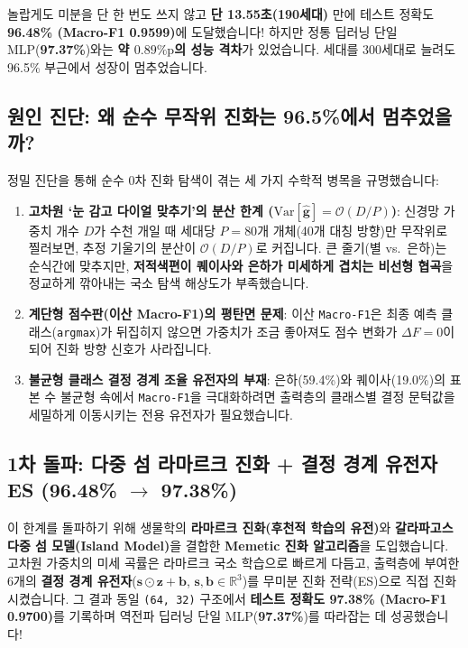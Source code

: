 \documentclass[11pt,a4paper]{article}
\begin{document}
놀랍게도 미분을 단 한 번도 쓰지 않고 \textbf{단 13.55초(190세대)} 만에 테스트 정확도 \textbf{96.48\% (Macro-F1 0.9599)}에 도달했습니다! 하지만 정통 딥러닝 단일 MLP(\textbf{97.37\%})와는 \textbf{약 $0.89\%\text{p}$의 성능 격차}가 있었습니다. 세대를 300세대로 늘려도 96.5\% 부근에서 성장이 멈추었습니다.

\subsection{원인 진단: 왜 순수 무작위 진화는 96.5\%에서 멈추었을까?}

정밀 진단을 통해 순수 0차 진화 탐색이 겪는 세 가지 수학적 병목을 규명했습니다:
\begin{enumerate}[leftmargin=18pt, itemsep=3pt]
  \item \textbf{고차원 `눈 감고 다이얼 맞추기'의 분산 한계 ($\mathrm{Var}[\hat{\mathbf{g}}] = \mathcal{O}(D/P)$)}:
    신경망 가중치 개수 $D$가 수천 개일 때 세대당 $P=80$개 개체(40개 대칭 방향)만 무작위로 찔러보면, 추정 기울기의 분산이 $\mathcal{O}(D/P)$로 커집니다. 큰 줄기(별 vs.\ 은하)는 순식간에 맞추지만, \textbf{저적색편이 퀘이사와 은하가 미세하게 겹치는 비선형 협곡}을 정교하게 깎아내는 국소 탐색 해상도가 부족했습니다.
  \item \textbf{계단형 점수판(이산 Macro-F1)의 평탄면 문제}:
    이산 \texttt{Macro-F1}은 최종 예측 클래스(\texttt{argmax})가 뒤집히지 않으면 가중치가 조금 좋아져도 점수 변화가 $\Delta F = 0$이 되어 진화 방향 신호가 사라집니다.
  \item \textbf{불균형 클래스 결정 경계 조율 유전자의 부재}:
    은하(59.4\%)와 퀘이사(19.0\%)의 표본 수 불균형 속에서 \texttt{Macro-F1}을 극대화하려면 출력층의 클래스별 결정 문턱값을 세밀하게 이동시키는 전용 유전자가 필요했습니다.
\end{enumerate}

\subsection{1차 돌파: 다중 섬 라마르크 진화 + 결정 경계 유전자 ES (96.48\% \texorpdfstring{$\rightarrow$}{->} 97.38\%)}

이 한계를 돌파하기 위해 생물학의 \textbf{라마르크 진화(후천적 학습의 유전)}와 \textbf{갈라파고스 다중 섬 모델(Island Model)}을 결합한 \textbf{Memetic 진화 알고리즘}을 도입했습니다. 고차원 가중치의 미세 곡률은 라마르크 국소 학습으로 빠르게 다듬고, 출력층에 부여한 6개의 \textbf{결정 경계 유전자}($\mathbf{s} \odot \mathbf{z} + \mathbf{b}$, $\mathbf{s}, \mathbf{b} \in \mathbb{R}^3$)를 무미분 진화 전략(ES)으로 직접 진화시켰습니다. 그 결과 동일 \texttt{(64, 32)} 구조에서 \textbf{테스트 정확도 97.38\% (Macro-F1 0.9700)}를 기록하며 역전파 딥러닝 단일 MLP(\textbf{97.37\%})를 따라잡는 데 성공했습니다!
\end{document}
